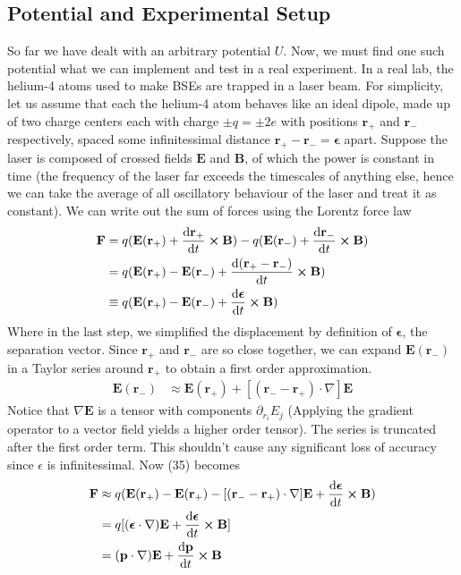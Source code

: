\documentclass{article}
\newcommand{\ve}{\mathbf}
\newcommand{\pa}{\partial}
\begin{document}
\subsection{Potential and Experimental Setup}
So far we have dealt with an arbitrary potential $U$. Now, we must find one such potential 
what we can implement and test in a real experiment.  
In a real lab, the helium-4 atoms used to make BSEs are trapped in a laser beam. For simplicity, 
let us assume that each the helium-4 atom behaves like an ideal dipole, made up of two charge centers each with charge
 $\pm q=\pm2e$ with positions $\ve{r}_+$ and $\ve{r}_-$ respectively,  spaced some infinitessimal distance $\ve{r}_+-\ve{r}_-=\boldsymbol{\epsilon}$ apart. Suppose the laser is composed of 
crossed fields $\ve{E}$ and $\ve{B}$, of which the power is constant in time 
(the frequency of the laser far exceeds the timescales of anything else, hence we can take the average of all oscillatory behaviour of the laser and treat it as constant). We can write out 
the sum of forces using the Lorentz force law 
\begin{align}
    \ve{F}&=q(\ve{E}(\ve{r}_+)+\dv{\ve{r_+}}{t}\cross\ve{B})-q(\ve{E}(\ve{r}_-)+\dv{\ve{r_-}}{t}\cross\ve{B})\\ 
    &=q(\ve{E}(\ve{r}_+)-\ve{E}(\ve{r}_-)+\dv{(\ve{r}_+-\ve{r_-})}{t}\cross\ve{B})\\ 
    &\equiv q(\ve{E}(\ve{r}_+)-\ve{E}(\ve{r}_-)+\dv{\boldsymbol{\epsilon}}{t}\cross\ve{B}) 
\end{align}
Where in the last step, we simplified the displacement by definition of $\boldsymbol{\epsilon}$, the 
separation vector. Since $\ve{r}_+$ and $\ve{r}_-$ are so close together,
 we can expand $\ve{E}(\ve{r}_-)$ in a Taylor series around $\ve{r}_+$ to obtain a first order
  approximation. 
\begin{align}
    \ve{E}(\ve{r}_-)&\approx\ve{E}(\ve{r}_+)+[(\ve{r}_--\ve{r}_+)\cdot\nabla]\ve{E}
\end{align}
Notice that $\nabla\ve{E}$ is a tensor with components $\pa_{r_i}E_j$ 
(Applying the gradient operator to a vector field yields a higher order tensor). The series is truncated after the first order term. This shouldn't cause any significant loss of 
accuracy since $\epsilon$ is infinitessimal. Now (35) becomes 
\begin{align}
    \ve{F}&\approx q(\ve{E}(\ve{r}_+)-\ve{E}(\ve{r}_+)-[(\ve{r}_--\ve{r}_+)\cdot\nabla]\ve{E}+\dv{\boldsymbol{\epsilon}}{t}\cross\ve{B}) \\ 
    &= q[(\boldsymbol{\epsilon}\cdot\nabla)\ve{E}+\dv{\boldsymbol{\epsilon}}{t}\cross\ve{B}]\\ 
    &=(\ve{p}\cdot\nabla)\ve{E}+\dv{\ve{p}}{t}\cross\ve{B}
\end{align}
\end{document}
